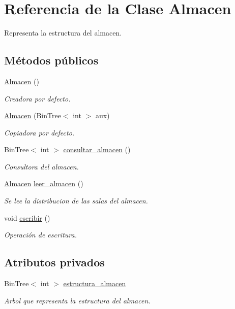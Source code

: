 \hypertarget{class_almacen}{}\section{Referencia de la Clase Almacen}
\label{class_almacen}


Representa la estructura del almacen.  


\subsection*{Métodos públicos}
\begin{DoxyCompactItemize}
\item 
\hyperlink{class_almacen_a68a6084d5775d391c52d4825072a0612}{Almacen} ()
\begin{DoxyCompactList}\small\item\em Creadora por defecto. \end{DoxyCompactList}\item 
\hyperlink{class_almacen_a1f4b6a1196d0c571c06012096e9401a2}{Almacen} (Bin\+Tree$<$ int $>$ aux)
\begin{DoxyCompactList}\small\item\em Copiadora por defecto. \end{DoxyCompactList}\item 
Bin\+Tree$<$ int $>$ \hyperlink{class_almacen_af16a0a319f91554aad713c14ee95715b}{consultar\+\_\+almacen} ()
\begin{DoxyCompactList}\small\item\em Consultora del almacen. \end{DoxyCompactList}\item 
\hyperlink{class_almacen}{Almacen} \hyperlink{class_almacen_a36e2c6293837248738e5783e8e69795d}{leer\+\_\+almacen} ()
\begin{DoxyCompactList}\small\item\em Se lee la distribucion de las salas del almacen. \end{DoxyCompactList}\item 
void \hyperlink{class_almacen_a0757bdd016511f5b2b1019060c0b2a9c}{escribir} ()
\begin{DoxyCompactList}\small\item\em Operación de escritura. \end{DoxyCompactList}\end{DoxyCompactItemize}
\subsection*{Atributos privados}
\begin{DoxyCompactItemize}
\item 
Bin\+Tree$<$ int $>$ \hyperlink{class_almacen_a0744bed3ca8c796990c939bbf7fc03b9}{estructura\+\_\+almacen}
\begin{DoxyCompactList}\small\item\em Arbol que representa la estructura del almacen. \end{DoxyCompactList}\end{DoxyCompactItemize}


